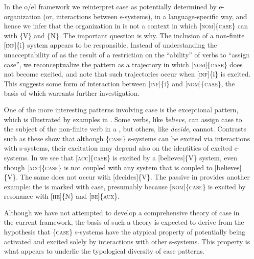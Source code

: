 \ea\label{ex:4:1}


\z
\z

  In the o/el framework we reinterpret case as potentially determined by e-organization (or, interactions between s-systems), in a language-specific way, and hence we infer that the organization in  is not a context in which [\textsc{nom}]\linebreak\{\textsc{case}\} can  with \{V\} and \{N\}. The important question is why. The inclusion of a non-finite [\textsc{inf}]\{i\} system appears to be responsible. Instead of understanding the unacceptability of  as the result of a restriction on the “ability” of verbs to “assign case”, we reconceptualize the pattern as a trajectory in which [\textsc{nom}]\{\textsc{case}\} does not become excited, and note that such trajectories occur when [\textsc{inf}]\{i\} is excited. This suggests some form of interaction between [\textsc{inf}]\{i\} and [\textsc{nom}]\{\textsc{case}\}, the basis of which warrants further investigation.

  One of the more interesting patterns involving case is the exceptional  pattern, which is illustrated by examples in . Some verbs, like \textit{believe}, can assign case to the subject of the non-finite verb in a , but others, like \textit{decide}, cannot. Contrasts such as these show that although \{\textsc{case}\} s-systems can be excited via interactions with s-systems, their excitation may depend also on the identities of excited c-systems. In  we see that \textsc{[acc]\{case\}} is excited by a [believes]\{V\} system, even though \textsc{[acc]\{case\}} is not coupled with any system that is coupled to [believes]\{V\}. The same does not occur with [decides]\{V\}. The passive in  provides another example: the  is marked with  case, presumably because [\textsc{nom}]\{\textsc{case}\} is excited by resonance with [\textsc{he}]\{N\} and [\textsc{be}]\{\textsc{aux}\}.

  \ea\label{ex:4:2}
  \z
  \z
  Although we have not attempted to develop a comprehensive theory of case in the current framework, the basis of such a theory is expected to derive from the hypothesis that \{\textsc{case}\} s-systems have the atypical property of potentially being activated and excited solely by interactions with other s-systems. This property is what appears to underlie the typological diversity of case patterns. 

